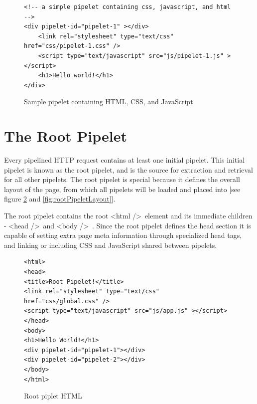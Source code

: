 \documentclass[12pt]{report}
\begin{document}
\begin{figure}[H]
\label{fig:samplePipelet}
\begin{lstlisting}
<!-- a simple pipelet containing css, javascript, and html -->
<div pipelet-id="pipelet-1" ></div>
	<link rel="stylesheet" type="text/css" href="css/pipelet-1.css" />
	<script type="text/javascript" src="js/pipelet-1.js" ></script>
	<h1>Hello world!</h1>
</div>
\end{lstlisting}
\caption{Sample pipelet containing HTML, CSS, and JavaScript}
\end{figure}


\section{The Root Pipelet}
Every pipelined HTTP request contains at least one initial pipelet. This initial pipelet is known as the root pipelet, and is the source for extraction and retrieval for all other pipelets. The root pipelet is special because it defines the overall layout of the page, from which all pipelets will be loaded and placed into [see figure \ref{fig:sampleRootPipelet} and \ref{fig:rootPipeletLayout}]. 
	
The root pipelet contains the root \textless html /\textgreater\ element and its immediate children - \textless head /\textgreater\ and \textless body /\textgreater\	. Since the root pipelet defines the head section it is capable of setting extra page meta information through specialized head tags, and linking or including CSS and JavaScript shared between pipelets.

\begin{figure}[H]
\label{fig:sampleRootPipelet}
\begin{lstlisting}
<html>
<head>
<title>Root Pipelet!</title>
<link rel="stylesheet" type="text/css" href="css/global.css" />
<script type="text/javascript" src="js/app.js" ></script>
</head>
<body>
<h1>Hello World!</h1>
<div pipelet-id="pipelet-1"></div>
<div pipelet-id="pipelet-2"></div>
</body>
</html>
\end{lstlisting}
\caption{Root piplet HTML}
\end{figure}
\end{document}
